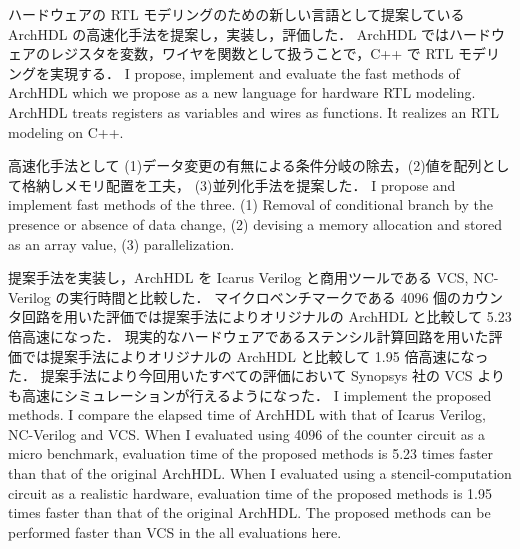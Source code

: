 ハードウェアの RTL モデリングのための新しい言語として提案している ArchHDL の高速化手法を提案し，実装し，評価した．
ArchHDL ではハードウェアのレジスタを変数，ワイヤを関数として扱うことで，C++ で RTL モデリングを実現する．
\fi
I propose, implement and evaluate the fast methods of ArchHDL which we propose as a new language for hardware RTL modeling.
ArchHDL treats registers as variables and wires as functions.
It realizes an RTL modeling on C++.

高速化手法として (1)データ変更の有無による条件分岐の除去，(2)値を配列として格納しメモリ配置を工夫，
(3)並列化手法を提案した．
\fi
I propose and implement fast methods of the three.
(1) Removal of conditional branch by the presence or absence of data change,
(2) devising a memory allocation and stored as an array value,
(3) parallelization.

提案手法を実装し，ArchHDL を Icarus Verilog と商用ツールである VCS, NC-Verilog の実行時間と比較した．
マイクロベンチマークである 4096 個のカウンタ回路を用いた評価では提案手法によりオリジナルの ArchHDL と比較して 5.23 倍高速になった．
現実的なハードウェアであるステンシル計算回路を用いた評価では提案手法によりオリジナルの ArchHDL と比較して 1.95 倍高速になった．
提案手法により今回用いたすべての評価において Synopsys 社の VCS よりも高速にシミュレーションが行えるようになった．
\fi
I implement the proposed methods. I compare the elapsed time of ArchHDL with that of Icarus Verilog, NC-Verilog and VCS.
When I evaluated using 4096 of the counter circuit as a micro benchmark,
evaluation time of the proposed methods is 5.23 times faster than that of the original ArchHDL.
When I evaluated using a stencil-computation circuit as a realistic hardware,
evaluation time of the proposed methods is 1.95 times faster than that of the original ArchHDL.
The proposed methods can be performed faster than VCS in the all evaluations here.